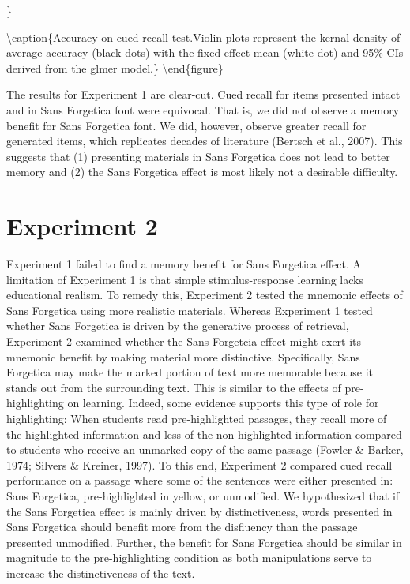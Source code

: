 \documentclass[english,pdf]{apa6}
\begin{document}
\}

\textbackslash{}caption\{Accuracy on cued recall test.Violin plots represent the kernal density of average accuracy (black dots) with the fixed effect mean (white dot) and 95\% CIs derived from the glmer model.\}\label{fig:unnamed-chunk-2}
\textbackslash{}end\{figure\}

The results for Experiment 1 are clear-cut. Cued recall for items presented intact and in Sans Forgetica font were equivocal. That is, we did not observe a memory benefit for Sans Forgetica font. We did, however, observe greater recall for generated items, which replicates decades of literature (Bertsch et al., 2007). This suggests that (1) presenting materials in Sans Forgetica does not lead to better memory and (2) the Sans Forgetica effect is most likely not a desirable difficulty.

\hypertarget{experiment-2}{%
\section{Experiment 2}\label{experiment-2}}

Experiment 1 failed to find a memory benefit for Sans Forgetica effect. A limitation of Experiment 1 is that simple stimulus-response learning lacks educational realism. To remedy this, Experiment 2 tested the mnemonic effects of Sans Forgetica using more realistic materials. Whereas Experiment 1 tested whether Sans Forgetica is driven by the generative process of retrieval, Experiment 2 examined whether the Sans Forgetcia effect might exert its mnemonic benefit by making material more distinctive. Specifically, Sans Forgetica may make the marked portion of text more memorable because it stands out from the surrounding text. This is similar to the effects of pre-highlighting on learning. Indeed, some evidence supports this type of role for highlighting: When students read pre-highlighted passages, they recall more of the highlighted information and less of the non-highlighted information compared to students who receive an unmarked copy of the same passage (Fowler \& Barker, 1974; Silvers \& Kreiner, 1997). To this end, Experiment 2 compared cued recall performance on a passage where some of the sentences were either presented in: Sans Forgetica, pre-highlighted in yellow, or unmodified. We hypothesized that if the Sans Forgetica effect is mainly driven by distinctiveness, words presented in Sans Forgetica should benefit more from the disfluency than the passage presented unmodified. Further, the benefit for Sans Forgetica should be similar in magnitude to the pre-highlighting condition as both manipulations serve to increase the distinctiveness of the text.
\end{document}
